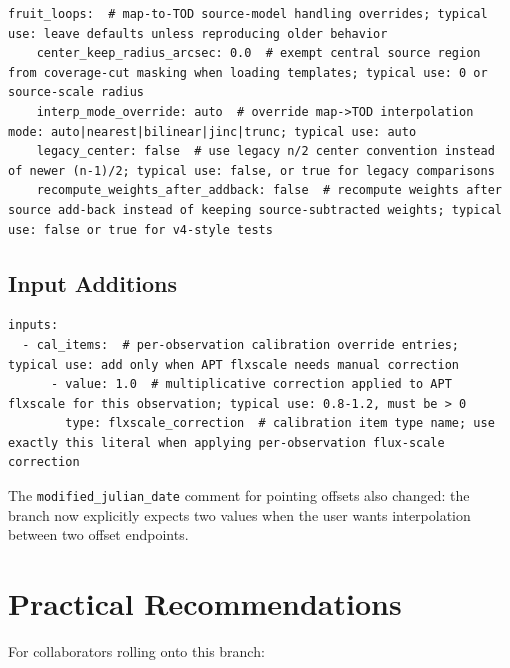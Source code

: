 \documentclass[11pt]{article}
\begin{document}
\begin{lstlisting}[language={}]
  fruit_loops:  # map-to-TOD source-model handling overrides; typical use: leave defaults unless reproducing older behavior
    center_keep_radius_arcsec: 0.0  # exempt central source region from coverage-cut masking when loading templates; typical use: 0 or source-scale radius
    interp_mode_override: auto  # override map->TOD interpolation mode: auto|nearest|bilinear|jinc|trunc; typical use: auto
    legacy_center: false  # use legacy n/2 center convention instead of newer (n-1)/2; typical use: false, or true for legacy comparisons
    recompute_weights_after_addback: false  # recompute weights after source add-back instead of keeping source-subtracted weights; typical use: false or true for v4-style tests
\end{lstlisting}

\subsection{Input Additions}

\begin{lstlisting}[language={}]
inputs:
  - cal_items:  # per-observation calibration override entries; typical use: add only when APT flxscale needs manual correction
      - value: 1.0  # multiplicative correction applied to APT flxscale for this observation; typical use: 0.8-1.2, must be > 0
        type: flxscale_correction  # calibration item type name; use exactly this literal when applying per-observation flux-scale correction
\end{lstlisting}

The \texttt{modified\_julian\_date} comment for pointing offsets also changed:
the branch now explicitly expects two values when the user wants interpolation
between two offset endpoints.

\section{Practical Recommendations}

For collaborators rolling onto this branch:
\end{document}
